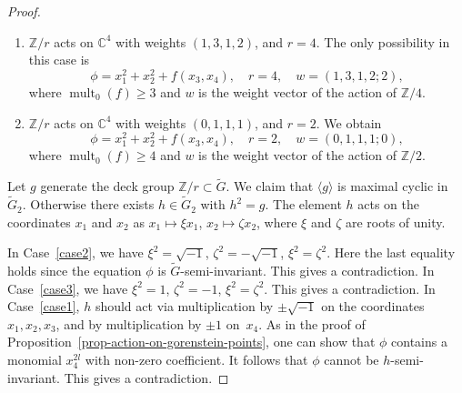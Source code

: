 \documentclass[11pt]{amsart}
\numberwithin{equation}{section}
\theoremstyle{definition}
\theoremstyle{remark}
\DeclareMathOperator{\mult}{mult}
\begin{document}
\begin{proof}
\begin{enumerate}[wide,label=\textit{Case}~\arabic*:, ref=\arabic*]
If follows that $\xi_r^{2a} x_1^2 + \xi_r^{-2a} x_2^2$ should be equal to $x_1^2 + x_2^2$, which is possible only if $\xi_r^{2a}=1$. Since $a$ is coprime with $r$, this implies that $r=2$ in this case.
We obtain 
\begin{equation}
\label{eq-terminal-point-abelian-3}
\phi = x_1^2 + x_2^2 + f(x_3,x_4),  \quad r=2,  \quad w=(1,1,1,0;0), 
\end{equation}
where $\mult_0 (f)\geq 2$, $w$ is the weight vector of the action of $\mathbb{Z}/2$ on $\mathbb{C}^4$, and  {its last element is the weight of~$\phi$. It is equal to $0$, indicating that $\phi$ is $\mathbb{Z}/2$-invariant. }

\item\label{case2}
$\mathbb{Z}/r$ acts on $\mathbb{C}^4$ with  weights $(1,3,1,2)$, and $r=4$. The only possibility in this case is
\begin{equation}
\label{eq-terminal-point-abelian-1}
\phi = x_1^2 + x_2^2 + f(x_3,x_4),  \quad r=4,  \quad  w=(1,3,1,2;2), 
\end{equation}
where $\mult_0 (f)\geq 3$ and $w$ is the weight vector of the action of $\mathbb{Z}/4$.

\item\label{case3} $\mathbb{Z}/r$ acts on $\mathbb{C}^4$ with weights $(0,1,1,1)$, and $r=2$. 
We obtain 
\begin{equation}
\label{eq-terminal-point-abelian-2}
\phi = x_1^2 + x_2^2 + f(x_3,x_4),  \quad r=2,  \quad w=(0,1,1,1;0), 
\end{equation}
where $\mult_0 (f)\geq 4$ and $w$ is the weight vector of the action of $\mathbb{Z}/2$.
\end{enumerate}

Let $g$ generate the deck group $\mathbb{Z}/r\subset\widetilde G$. We claim that $\langle g\rangle$ is maximal cyclic in $\widetilde G_2$. Otherwise there exists $h\in\widetilde G_2$ with $h^2=g$. The element $h$ acts on the coordinates $x_1$ and $x_2$ as $x_1\mapsto \xi x_1$, $x_2\mapsto \zeta x_2$, where $\xi$ and $\zeta$ are roots of unity.

In Case~\ref{case2}, we have $\xi^2=\sqrt{-1}$, $\zeta^2=-\sqrt{-1}$, $\xi^2=\zeta^2$. Here the last equality holds since the equation $\phi$ is $\widetilde{G}$-semi-invariant. This gives a contradiction. 
In Case~\ref{case3}, we have $\xi^2=1$, $\zeta^2=-1$, $\xi^2=\zeta^2$. This gives a contradiction. 
In Case~\ref{case1}, $h$ should act via multiplication by $\pm \sqrt{-1}$ on the coordinates $x_1,x_2,x_3$, and by multiplication by $\pm1$ on~$x_4$. 
As in the proof of Proposition~\ref{prop-action-on-gorenstein-points}, one can show that $\phi$ contains a monomial $x_4^{2l}$ with non-zero coefficient. It follows that $\phi$ cannot be $h$-semi-invariant. This gives a contradiction.


\end{proof}
\end{document}
